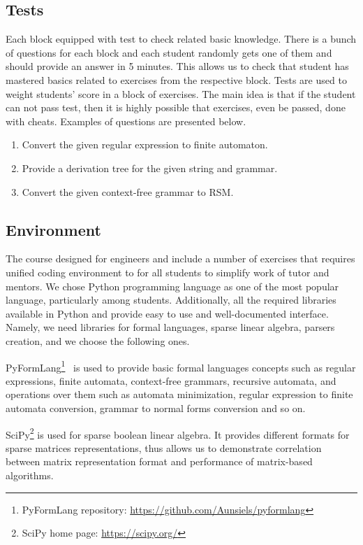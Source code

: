 \documentclass[sigconf]{acmart}
\begin{document}
\subsection{Tests}

Each block equipped with test to check related basic knowledge.
There is a bunch of questions for each block and each student randomly gets one of them and should provide an answer in 5 minutes. 
This allows us to check that student has mastered basics related to exercises from the respective block.
Tests are used to weight students' score in a block of exercises. 
The main idea is that if the student can not pass test, then it is highly possible that exercises, even be passed, done with cheats.
Examples of questions are presented below.
\begin{enumerate}
   \item Convert the given regular expression to finite automaton.
   \item Provide a derivation tree for the given string and grammar.
   \item Convert the given context-free grammar to RSM.
\end{enumerate}


\subsection{Environment}

The course designed for engineers and include a number of exercises that requires unified coding environment to for all students to simplify work of tutor and mentors.
We chose Python programming language as one of the most popular language, particularly among students.
Additionally, all the required libraries available in Python and provide easy to use and well-documented interface.
Namely, we need libraries for formal languages, sparse linear algebra, parsers creation, and we choose the following ones.

PyFormLang\footnote{PyFormLang repository: \url{https://github.com/Aunsiels/pyformlang}}~\cite{10.1145/3408877.3432464} is used to provide basic formal languages concepts such as regular expressions, finite automata, context-free grammars, recursive automata, and operations over them such as automata minimization, regular expression to finite automata conversion, grammar to normal forms conversion and so on. 

SciPy\footnote{SciPy home page: \url{https://scipy.org/}} is used for sparse boolean linear algebra.
It provides different formats for sparse matrices representations, thus allows us to demonstrate correlation between matrix representation format and performance of matrix-based algorithms. 
\end{document}
